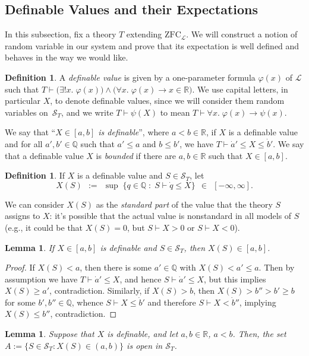 \documentclass[12pt]{article}
\newcommand{\vp}{\varphi}
\newcommand{\RR}{\mathbb{R}}
\newcommand{\QQ}{\mathbb{Q}}
\newcommand{\zfc}{\mathrm{ZFC}}
\newcommand{\zfcl}{{\zfc_\cL}}
\newcommand{\cL}{\mathcal{L}}
\newcommand{\cS}{\mathcal{S}}
\theoremstyle{plain}
\newtheorem{lemma}[theorem]{Lemma}
\theoremstyle{definition}
\newtheorem{definition}[theorem]{Definition}
\theoremstyle{remark}
\begin{document}
\subsection{Definable Values and their Expectations}
In this subsection, fix a theory $T$ extending $\zfcl$. We will construct a notion of random variable in our system and prove that its expectation is well defined and behaves in the way we would like.
\begin{definition}
A \emph{definable value} is given by a one-parameter formula $\vp(x)$ of $\cL$ such that $T\vdash\big(\exists!x.\;\vp(x)\big)\wedge\big(\forall x.\;\vp(x)\to x\in\RR\big)$. We use capital letters, in particular $X$, to denote definable values, since we will consider them random variables on~$\cS_T$, and we write $T\vdash\psi(X)$ to mean $T\vdash\forall x.\;\vp(x)\to\psi(x)$.

We say that ``\emph{$X\in[a,b]$ is definable}'', where $a<b\in\RR$, if $X$ is a definable value and for all $a',b'\in\QQ$ such that $a'\le a$ and $b\le b'$, we have $T\vdash\dot a'\le X\le \dot b'$.
We say that a definable value $X$ is \emph{bounded} if there are $a,b\in\RR$ such that $X\in[a,b]$.
\end{definition}
\begin{definition}
If $X$ is a definable value and $S\in\cS_T$, let
\[X(S) \;\,:=\;\, \sup\;\{q\in\QQ \;:\; S\vdash \dot q \le X\} \;\,\in\;\, [-\infty,\infty].\]
\end{definition}
We can consider $X(S)$ as the \emph{standard part} of the value that the theory $S$ assigns to $X$: it's possible that the actual value is nonstandard in all models of $S$ (e.g., it could be that $X(S) = 0$, but $S\vdash X>0$ or $S\vdash X<0$).
\begin{lemma}
If $X\in[a,b]$ is definable and $S\in\cS_T$, then $X(S)\in[a,b]$.
\end{lemma}
\begin{proof}
If $X(S) < a$, then there is some $a'\in\QQ$ with $X(S) < a' \le a$. Then by assumption we have $T\vdash\dot a'\le X$, and hence $S\vdash\dot a'\le X$, but this implies $X(S)\ge a'$, contradiction. Similarly, if $X(S) > b$, then $X(S) > b'' > b' \ge b$ for some $b',b''\in\QQ$, whence $S\vdash X\le\dot b'$ and therefore $S\vdash X<\dot b''$, implying $X(S) \le b''$, contradiction.
\end{proof}
\begin{lemma}
Suppose that $X$ is definable, and let $a,b\in\RR$, $a<b$. Then, the set $A := \{S\in\cS_T : X(S) \in (a,b)\}$ is open in $\cS_T$.
\end{lemma}
\end{document}
